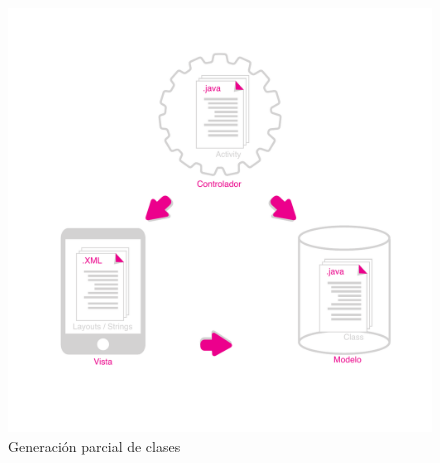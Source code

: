 \begin{figure}[ht]
\centering
\includegraphics[scale=0.5]{./imgs/esquemas/mvc.pdf}
\caption{Generación parcial de clases}
\label{fig:mvc}
\end{figure}

